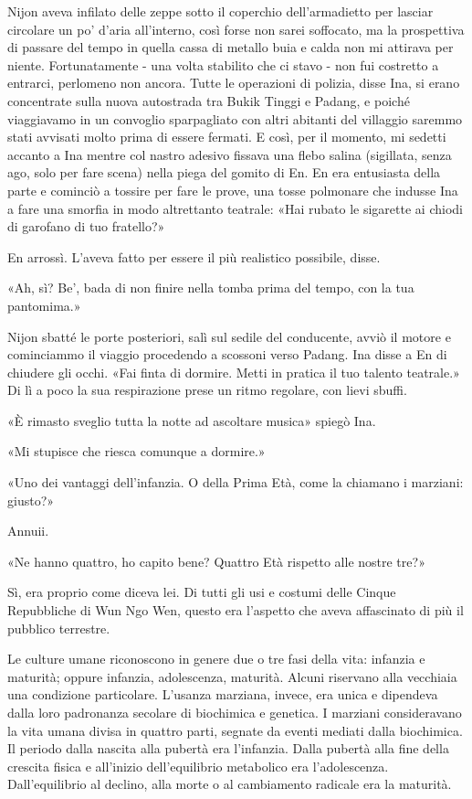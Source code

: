 Nijon aveva infilato delle zeppe sotto il coperchio dell'armadietto per
lasciar circolare un po' d'aria all'interno, così forse non sarei
soffocato, ma la prospettiva di passare del tempo in quella cassa di
metallo buia e calda non mi attirava per niente. Fortunatamente - una
volta stabilito che ci stavo - non fui costretto a entrarci, perlomeno
non ancora. Tutte le operazioni di polizia, disse Ina, si erano
concentrate sulla nuova autostrada tra Bukik Tinggi e Padang, e poiché
viaggiavamo in un convoglio sparpagliato con altri abitanti del
villaggio saremmo stati avvisati molto prima di essere fermati. E così,
per il momento, mi sedetti accanto a Ina mentre col nastro adesivo
fissava una flebo salina (sigillata, senza ago, solo per fare scena)
nella piega del gomito di En. En era entusiasta della parte e cominciò a
tossire per fare le prove, una tosse polmonare che indusse Ina a fare
una smorfia in modo altrettanto teatrale: «Hai rubato le sigarette ai
chiodi di garofano di tuo fratello?»

En arrossì. L'aveva fatto per essere il più realistico possibile, disse.

«Ah, sì? Be', bada di non finire nella tomba prima del tempo, con la tua
pantomima.»

Nijon sbatté le porte posteriori, salì sul sedile del conducente, avviò
il motore e cominciammo il viaggio procedendo a scossoni verso Padang.
Ina disse a En di chiudere gli occhi. «Fai finta di dormire. Metti in
pratica il tuo talento teatrale.» Di lì a poco la sua respirazione prese
un ritmo regolare, con lievi sbuffi.

«È rimasto sveglio tutta la notte ad ascoltare musica» spiegò Ina.

«Mi stupisce che riesca comunque a dormire.»

«Uno dei vantaggi dell'infanzia. O della Prima Età, come la chiamano i
marziani: giusto?»

Annuii.

«Ne hanno quattro, ho capito bene? Quattro Età rispetto alle nostre
tre?»

Sì, era proprio come diceva lei. Di tutti gli usi e costumi delle Cinque
Repubbliche di Wun Ngo Wen, questo era l'aspetto che aveva affascinato
di più il pubblico terrestre.

Le culture umane riconoscono in genere due o tre fasi della vita:
infanzia e maturità; oppure infanzia, adolescenza, maturità. Alcuni
riservano alla vecchiaia una condizione particolare. L'usanza marziana,
invece, era unica e dipendeva dalla loro padronanza secolare di
biochimica e genetica. I marziani consideravano la vita umana divisa in
quattro parti, segnate da eventi mediati dalla biochimica. Il periodo
dalla nascita alla pubertà era l'infanzia. Dalla pubertà alla fine della
crescita fisica e all'inizio dell'equilibrio metabolico era
l'adolescenza. Dall'equilibrio al declino, alla morte o al cambiamento
radicale era la maturità.

